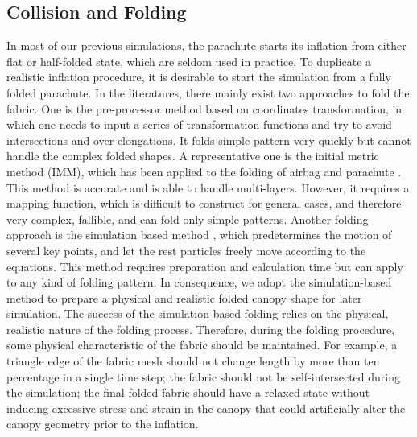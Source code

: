 \subsection{Collision and Folding}
In most of our previous simulations, the parachute starts its inflation from either flat or half-folded state, which are seldom used in practice. To duplicate a realistic inflation procedure, it is desirable to start the simulation from a fully folded parachute. In the literatures, there mainly exist two approaches to fold the fabric. One is the pre-processor method based on coordinates transformation, in which one needs to input a series of transformation functions and try to avoid intersections and over-elongations. It folds simple pattern very quickly but cannot handle the complex folded shapes. A representative one is the initial metric method (IMM), which has been applied to the folding of airbag \cite{Tanavde1995Airbag, Zhang2005Airbag} and parachute \cite{Zhan2014Initial}. This method is accurate and is able to handle multi-layers. However, it requires a mapping function, which is difficult to construct for general cases, and therefore very complex, fallible, and can fold only simple patterns. Another folding approach is the simulation based method \cite{Hayashi2013Jfold, Hayashi2014Jfold, Taylor2015Using}, which predetermines the motion of several key points, and let the rest particles freely move according to the equations. This method requires preparation and calculation time but can apply to any kind of folding pattern. In consequence, we adopt the simulation-based method to prepare a physical and realistic folded canopy shape for later simulation. The success of the simulation-based folding relies on the physical, realistic nature of the folding process. Therefore, during the folding procedure, some physical characteristic of the fabric should be maintained. For example, a triangle edge of the fabric mesh should not change length by more than ten percentage in a single time step\cite{Caramana1999Construction}; the fabric should not be self-intersected during the simulation\cite{Bridson2005Robust}; the final folded fabric should have a relaxed state without inducing excessive stress and strain in the canopy that could artificially alter the canopy geometry prior to the inflation\cite{Tutt2011Finite}.

